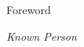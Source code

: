 \cleardoublepage

{\normalfont\huge\noindent Foreword}
\par\vspace{8\onelineskip}

\noindent \lipsum[1-4]

\vspace*{0.5\onelineskip}
\hspace*{\fill} \textit{Known Person}